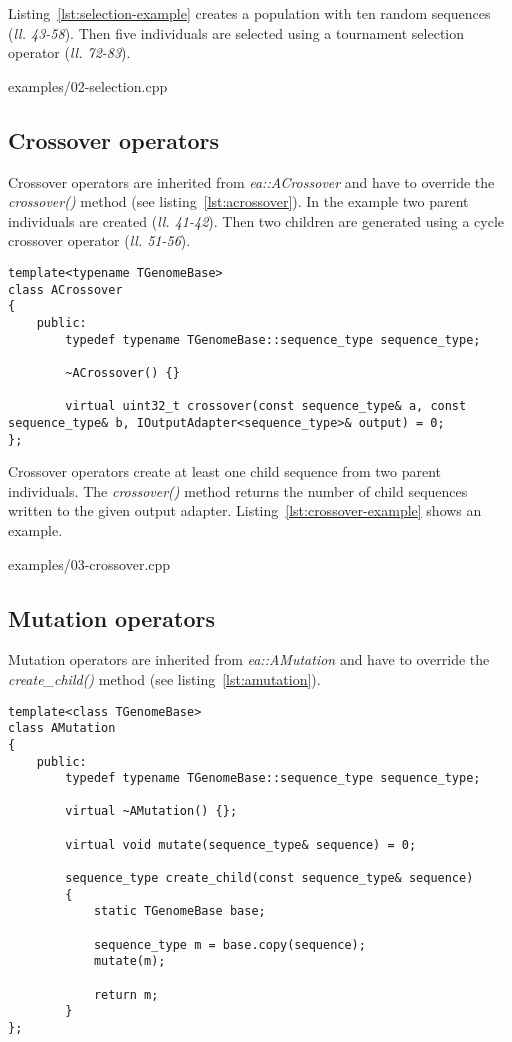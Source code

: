 \documentclass[a4paper]{article}
\begin{document}
Listing~\ref{lst:selection-example} creates a population with ten random sequences  (\textit{ll. 43-58}). Then five individuals are selected using a tournament selection operator (\textit{ll. 72-83}).

\begin{lstinputlisting}[caption=selection operators,label=lst:selection-example]{examples/02-selection.cpp}
\end{lstinputlisting}

\subsection{Crossover operators}

Crossover operators are inherited from \textit{ea::ACrossover} and have to override the \textit{crossover()} method (see listing~\ref{lst:acrossover}). In the example two parent individuals are created (\textit{ll. 41-42}). Then two children are generated using a cycle crossover operator (\textit{ll. 51-56}). 

\begin{lstlisting}[caption=ACrossover,label=lst:acrossover]
template<typename TGenomeBase>
class ACrossover
{
	public:
		typedef typename TGenomeBase::sequence_type sequence_type;

		~ACrossover() {}

		virtual uint32_t crossover(const sequence_type& a, const sequence_type& b, IOutputAdapter<sequence_type>& output) = 0;
};
\end{lstlisting}

Crossover operators create at least one child sequence from two parent individuals. The \textit{crossover()} method returns the number of child sequences written to the given output adapter. Listing~\ref{lst:crossover-example} shows an example.

\begin{lstinputlisting}[caption=crossover operators,label=lst:crossover-example]{examples/03-crossover.cpp}
\end{lstinputlisting}

\subsection{Mutation operators}

Mutation operators are inherited from \textit{ea::AMutation} and have to override the \textit{create\_child()} method (see listing~\ref{lst:amutation}). 

\begin{lstlisting}[caption=AMutation,label=lst:amutation]
template<class TGenomeBase>
class AMutation
{
	public:
		typedef typename TGenomeBase::sequence_type sequence_type;

		virtual ~AMutation() {};

		virtual void mutate(sequence_type& sequence) = 0;

		sequence_type create_child(const sequence_type& sequence)
		{
			static TGenomeBase base;

			sequence_type m = base.copy(sequence);
			mutate(m);

			return m;
		}
};
\end{lstlisting}
\end{document}
